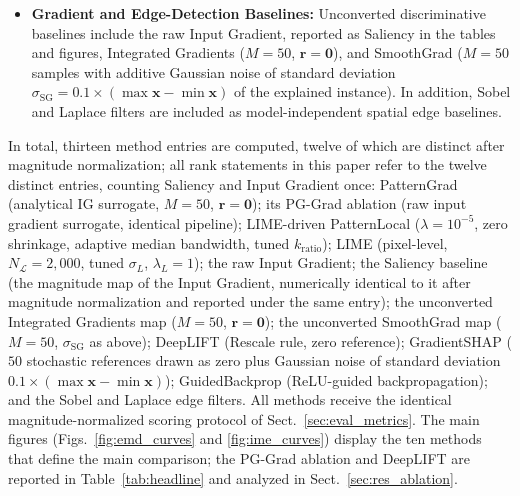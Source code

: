 \documentclass[pdflatex,sn-mathphys-num]{sn-jnl}
\theoremstyle{thmstyleone}
\theoremstyle{thmstyletwo}%
\theoremstyle{thmstylethree}%
\begin{document}
\begin{itemize}
    \item \textbf{Gradient and Edge-Detection Baselines:} Unconverted discriminative baselines include the raw Input Gradient, reported as Saliency in the tables and figures, Integrated Gradients ($M = 50$, $\mathbf{r} = \mathbf{0}$), and SmoothGrad ($M = 50$ samples with additive Gaussian noise of standard deviation $\sigma_{\text{SG}} = 0.1 \times (\max \mathbf{x} - \min \mathbf{x})$ of the explained instance). In addition, Sobel and Laplace filters are included as model-independent spatial edge baselines.
\end{itemize}

In total, thirteen method entries are computed, twelve of which are distinct after magnitude normalization; all rank statements in this paper refer to the twelve distinct entries, counting Saliency and Input Gradient once: PatternGrad (analytical IG surrogate, $M = 50$, $\mathbf{r} = \mathbf{0}$); its PG-Grad ablation (raw input gradient surrogate, identical pipeline); LIME-driven PatternLocal ($\lambda = 10^{-5}$, zero shrinkage, adaptive median bandwidth, tuned $k_{\text{ratio}}$); LIME (pixel-level, $N_{\mathcal{L}} = 2{,}000$, tuned $\sigma_L$, $\lambda_L = 1$); the raw Input Gradient; the Saliency baseline (the magnitude map of the Input Gradient, numerically identical to it after magnitude normalization and reported under the same entry); the unconverted Integrated Gradients map ($M = 50$, $\mathbf{r} = \mathbf{0}$); the unconverted SmoothGrad map ($M = 50$, $\sigma_{\text{SG}}$ as above); DeepLIFT (Rescale rule, zero reference); GradientSHAP ($50$ stochastic references drawn as zero plus Gaussian noise of standard deviation $0.1 \times (\max \mathbf{x} - \min \mathbf{x})$); GuidedBackprop (ReLU-guided backpropagation); and the Sobel and Laplace edge filters. All methods receive the identical magnitude-normalized scoring protocol of Sect.~\ref{sec:eval_metrics}. The main figures (Figs.~\ref{fig:emd_curves} and \ref{fig:ime_curves}) display the ten methods that define the main comparison; the PG-Grad ablation and DeepLIFT are reported in Table~\ref{tab:headline} and analyzed in Sect.~\ref{sec:res_ablation}.
\end{document}
